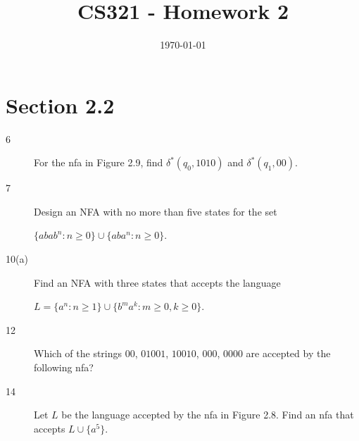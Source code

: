 \documentclass[12pt]{article}
\title{CS321 - Homework 2}
\date{\today}
\begin{document}
\maketitle

%
%
\section*{Section 2.2}

\begin{description}
    \item[6] For the nfa in Figure 2.9, find $\delta^*(q_0, 1010)$ and $\delta^*(q_1, 00)$.

    \item[7] Design an NFA with no more than five states for the set

        $\{abab^n : n \ge 0\} \cup \{aba^n : n \ge 0\}$.

    \item[10(a)] Find an NFA with three states that accepts the language

        $L = \{a^n: n \ge 1\} \cup \{b^m a^k : m \ge 0, k \ge 0 \}$.

    \item[12] Which of the strings $00$, $01001$, $10010$, $000$, $0000$ are accepted by the following
        nfa?

        \begin{center}
        \end{center}

 
    \item[14] Let $L$ be the language accepted by the nfa in Figure 2.8. Find an nfa that
        accepts $L \cup \{a^5\}$.



\end{description}
\end{document}
